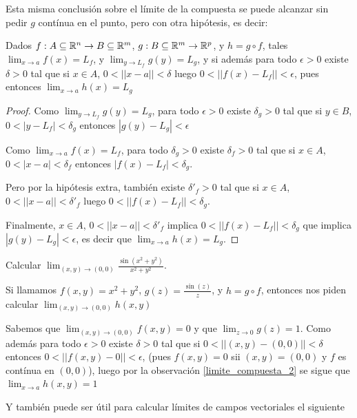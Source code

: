 Esta misma conclusión sobre el límite de la compuesta se puede alcanzar sin pedir $g$ contínua en el punto, pero con otra hipótesis, es decir:

\begin{observation}[Optativa] \label{limite_compuesta_2}
Dados $f: A \subseteq \mathbb{R}^n \to B \subseteq \mathbb{R}^m$, $g : B \subseteq \mathbb{R}^m \to \mathbb{R}^p$, y $h = g \circ f$, tales $\lim_{x \to a} f(x) = L_f$, y $\lim_{y \to L_f} g(y) = L_g$, y si además para todo $\epsilon > 0$ existe $\delta > 0$ tal que si $x \in A$, $0 < ||x-a|| < \delta$ luego $0 < || f(x) - L_f|| < \epsilon$, pues entonces $\lim_{x \to a} h(x) = L_g$
\end{observation}

\begin{proof}
Como $\lim_{y \to L_f} g(y) = L_g$, para todo $\epsilon > 0$ existe $\delta_g > 0$ tal que si $y \in B$, $0 < |y-L_f| < \delta_g$ entonces $|g(y) - L_g| < \epsilon$

Como $\lim_{x \to a} f(x) = L_f$, para todo $\delta_g > 0$ existe $\delta_f > 0$ tal que si $x \in A$, $0 < |x-a| < \delta_f$ entonces $|f(x) - L_f| < \delta_g$.

Pero por la hipótesis extra, también existe $\delta'_f > 0$ tal que si $x \in A$, $0 < ||x-a|| < \delta'_f$ luego $0 < || f(x) - L_f|| < \delta_g$.

Finalmente, $x \in A$, $0 < ||x-a|| < \delta'_f$ implica $0 < || f(x) - L_f|| < \delta_g$ que implica $|g(y) - L_g| < \epsilon$, es decir que $\lim_{x \to a} h(x) = L_g$.
\end{proof}

\begin{example}
Calcular $\lim_{(x,y) \to (0,0)} \frac{\sin(x^2 + y^2)}{x^2 + y^2}$.

Si llamamos $f(x,y) = x^2 + y^2$, $g(z) = \frac{\sin(z)}{z}$, y $h = g \circ f$, entonces nos piden calcular $\lim_{(x,y) \to (0,0)} h(x,y)$

Sabemos que $\lim_{(x,y) \to (0,0)} f(x,y) = 0$ y que $\lim_{z \to 0} g(z) = 1$.  Como además para todo $\epsilon > 0$ existe $\delta > 0$ tal que si $0 < ||(x,y) - (0,0)|| < \delta$ entonces $ 0 < || f(x,y) - 0 || < \epsilon$, (pues $f(x,y) = 0$ sii $(x,y) = (0,0)$ y $f$ es contínua en $(0,0)$), luego por la observación \ref{limite_compuesta_2} se sigue que $\lim_{x \to a} h(x,y) = 1$
\end{example}

Y también puede ser útil para calcular límites de campos vectoriales el siguiente

